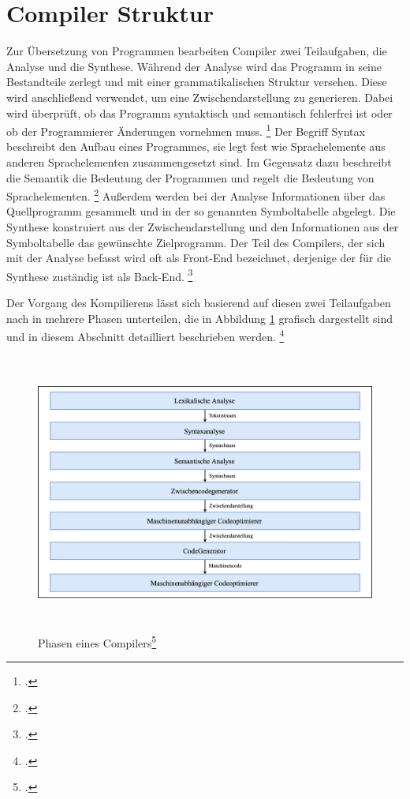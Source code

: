 \section{Compiler Struktur}
Zur Übersetzung von Programmen bearbeiten Compiler zwei Teilaufgaben,  die Analyse und die Synthese. Während der Analyse wird das Programm in seine Bestandteile zerlegt und mit einer grammatikalischen Struktur versehen. Diese wird anschließend verwendet, um eine Zwischendarstellung zu generieren.  Dabei wird überprüft, ob das Programm syntaktisch und semantisch fehlerfrei ist oder ob der Programmierer Änderungen vornehmen muss. \footcite[Vgl.][S. 6f]{Ullmann2008} Der Begriff Syntax beschreibt den Aufbau eines Programmes,  sie legt fest wie Sprachelemente aus anderen Sprachelementen zusammengesetzt sind.  Im Gegensatz dazu beschreibt die Semantik die Bedeutung der Programmen und regelt die Bedeutung von Sprachelementen.  \footcite[Vgl.][S. 36]{Schneider1975}  Außerdem werden bei der Analyse Informationen über das Quellprogramm gesammelt und in der so genannten Symboltabelle abgelegt.  Die Synthese konstruiert aus der Zwischendarstellung und den Informationen aus der Symboltabelle das gewünschte Zielprogramm.  Der Teil des Compilers, der sich mit der Analyse befasst wird oft als Front-End bezeichnet, derjenige der für die Synthese zuständig ist als Back-End.  \footcite[Vgl.][S. 6f]{Ullmann2008}

Der Vorgang des Kompilierens lässt sich basierend auf diesen zwei Teilaufgaben nach \citeauthor{Ullmann2008} in mehrere Phasen unterteilen,  die in Abbildung \ref{fig:Compilerphasen} grafisch dargestellt sind und in diesem Abschnitt detailliert beschrieben werden.  \footcite[Vgl.][S. 6]{Ullmann2008}

\begin{figure}[!ht]
 \includegraphics[width=14.5cm,height=9.15cm]{Images/Compiler/Phasen.png}
 \caption[Phasen eines Compilers]{Phasen eines Compilers\protect\footcite{Ullmann2008}}
 \label{fig:Compilerphasen}
\end{figure}


